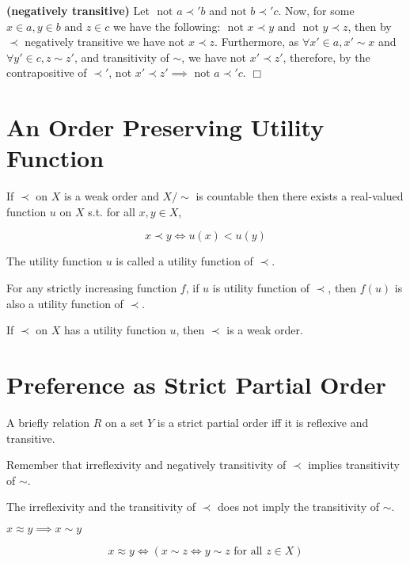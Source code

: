 \documentclass{article}
\theoremstyle{definition}
\def\tand{\text{ and }}
\def\tnot{\text{ not }}
\def\tforall{\text{ for all }}
\begin{document}
\begin{enumerate}
{\bf (negatively transitive)} Let $\tnot a\prec' b$ and$\tnot b\prec' c$. Now, for some $x\in a, y\in b\tand z\in c$ we have the following: $\tnot x\prec y\tand\tnot y\prec z$, then by $\prec$ negatively transitive we have not $x\prec z$. Furthermore, as $\forall x'\in a, x'\sim x$ and $\forall y'\in c, z\sim z'$, and transitivity of $\sim$, we have not $x'\prec z'$, therefore, by the contrapositive of $\prec'$, not $x'\prec z'\implies\tnot a\prec' c$. $\Box$
\end{enumerate}

\section{An Order Preserving Utility Function}

 If $\prec$ on $X$ is a weak order and $X/\sim$ is countable then there exists a real-valued function $u$ on $X$ s.t. for all $x,y\in X$,

\begin{equation*}
x\prec y\iff u(x)<u(y)
\end{equation*}

 The utility function $u$ is called a utility function of $\prec$.

 For any strictly increasing function $f$, if $u$ is utility function of $\prec$, then $f(u)$ is also a utility function of $\prec$.

 If $\prec$ on $X$ has a utility function $u$, then $\prec$ is a weak order.

\section{Preference as Strict Partial Order\label{sec:strictpartialorder}}

 A briefly relation $R$ on a set $Y$ is a strict partial order iff it is reflexive and transitive.

 Remember that irreflexivity and negatively transitivity of $\prec$ implies transitivity of $\sim$.

 The irreflexivity and the transitivity of $\prec$ does not imply the transitivity of $\sim$.

 $x\approx y\implies x\sim y$


\begin{equation*}
x\approx y\iff (x\sim z\iff y\sim z\tforall z\in X)
\end{equation*}
\end{document}
